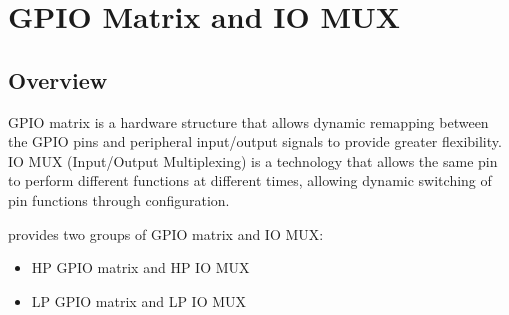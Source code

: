 \documentclass[main\_\_EN.tex]{subfiles}
\begin{document}

\ifglobal
\else
    \listoftodos
    {\let\clearpage\relax \listofdonetodos}
    \tableofcontents
\fi



\hypertarget{iomuxgpio}{}
\chapter{GPIO Matrix and IO MUX}
\label{mod:iomuxgpio}


\section{Overview}
GPIO matrix is a hardware structure that allows dynamic remapping between the GPIO pins and peripheral input/output signals to provide greater flexibility. IO MUX (Input/Output Multiplexing) is a technology that allows the same pin to perform different functions at different times, allowing dynamic switching of pin functions through configuration. 

\chipname{} provides two groups of GPIO matrix and IO MUX:
\begin{itemize}
    \item HP GPIO matrix and HP IO MUX
    \item LP GPIO matrix and LP IO MUX
\end{itemize}
\end{document}
